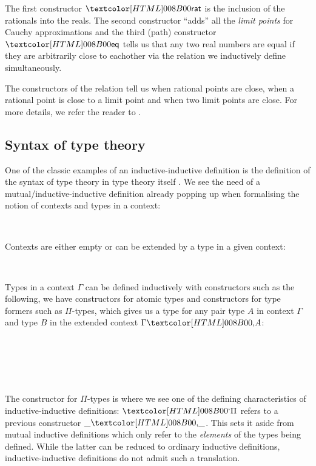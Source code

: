The first constructor $\realrat$ is the inclusion of the rationals
into the reals. The second constructor ``adds'' all the \emph{limit
  points} for Cauchy approximations and the third (path) constructor
$\realeq$ tells us that any two real numbers are equal if they are
arbitrarily close to eachother via the relation we inductively define
simultaneously.
%
\begin{datatype}{\realrel{\epsilon}{\_}{\_}}{}
  \constrdots
\end{datatype}
%
The constructors of the relation tell us when rational points are
close, when a rational point is close to a limit point and when two
limit points are close. For more details, we refer the reader to
\cite{UFP2013}.

\subsection{Syntax of type theory}

One of the classic examples of an inductive-inductive definition
\cite{NordvallForsberg2013} is the definition of the syntax of type
theory in type theory itself \cite{Danielsson2006}
\cite{Chapman2009}. We see the need of a mutual/inductive-inductive
definition already popping up when formalising the notion of contexts
and types in a context:
%
\begin{sorts}
  \sortnamety{\ttconty}{\Set} \\
  \sortnamety{\tttyty}{\ttconty \to \Set}
\end{sorts}
%
Contexts are either empty or can be extended by a type in a given
context:
%
\begin{datatype}{\ttconty}{}
  \constr{\ttnil}{\ttconty} \\
  \constr{\ttcons{\_}{\_}}{(\Gamma : \ttconty) \to \tttyty\ \Gamma \to \ttconty}
\end{datatype}
%
Types in a context $\Gamma$ can be defined inductively with
constructors such as the following, \ie we have constructors for
atomic types and constructors for type formers such as $\Pi$-types,
which gives us a type for any pair type $A$ in context $\Gamma$ and
type $B$ in the extended context $\ttcons{\Gamma}{A}$:
%
\begin{datatype}{\tttyty}{}
  \constr{\ttzero}{(\Gamma : \ttconty) \to \tttyty\ \Gamma} \\
  \constr{\ttone}{(\Gamma : \ttconty) \to \tttyty\ \Gamma} \\
  \constrdots \\
   \\
  \constrdots
\end{datatype}
%
The constructor for $\Pi$-types is where we see one of the defining
characteristics of inductive-inductive definitions: $\ttpi$ refers to
a previous constructor $\ttcons{\_}{\_}$. This sets it aside from
mutual inductive definitions which only refer to the \emph{elements}
of the types being defined. While the latter can be reduced to
ordinary inductive definitions, inductive-inductive definitions do not
admit such a translation.

